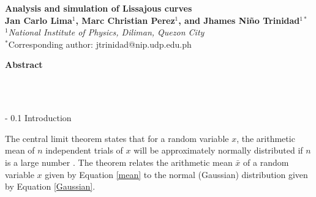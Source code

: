 \documentclass[twoside]{article}
\makeatletter
\renewcommand\section{\@startsection
   {section}{1}{0pt}%
   {-\baselineskip}%
   {0.1\baselineskip}%
   {\normalfont\large\bfseries}}%
\makeatother
\begin{document}
\begin{center}
{\Large\textbf{Analysis and simulation of Lissajous curves}}\\
\vspace{0.05in}
\textbf{Jan Carlo Lima$^1$, Marc Christian Perez$^1$, and Jhames Ni\~{n}o Trinidad$^{1 \ast}$}\\
\textit{$^1$National Institute of Physics, Diliman, Quezon City}\\
\textrm{$^{\ast}$Corresponding author: jtrinidad@nip.udp.edu.ph}\\

\vspace{0.15in}

\parbox{4.5in}{{\large \textbf{Abstract}}\\
\\

}\\
\end{center}

\section{Introduction}
\label{sec:intro}

The central limit theorem states that for a random variable $x$, the arithmetic mean of $n$ independent trials of $x$ will be approximately normally distributed if $n$ is a large number \cite{walpole}. The theorem relates the arithmetic mean $\bar{x}$ of a random variable $x$ given by Equation \ref{mean} to the normal (Gaussian) distribution given by Equation \ref{Gaussian}.
\end{document}
